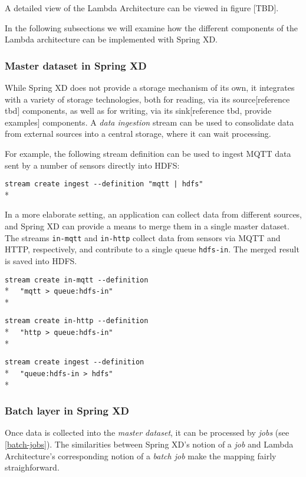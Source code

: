 A detailed view of the Lambda Architecture can be viewed in figure [TBD].

In the following subsections we will examine how the different components
of the Lambda architecture can be implemented with Spring XD.

\subsubsection {Master dataset in Spring XD}

While Spring XD does not provide a storage mechanism of its own, it 
integrates with a variety of storage technologies, both for reading,
via its source[reference tbd] components, as well as for writing, via 
its sink[reference tbd, provide examples] components. A \emph{data ingestion}
stream can be used to consolidate data from external sources into a
central storage, where it can wait processing.

For example, the following stream definition can be used to ingest 
MQTT data sent by a number of sensors directly into HDFS:

\verb;stream create ingest --definition "mqtt | hdfs";\\*

In a more elaborate setting, an application can collect data from
different sources, and Spring XD can provide a means to merge them
in a single master dataset. The streams \texttt{in-mqtt} and \texttt{in-http}
collect data from sensors via MQTT and HTTP, respectively, and
contribute to a single queue \texttt{hdfs-in}. The merged result
is saved into HDFS.

\verb;stream create in-mqtt --definition ;\\*
\verb;  "mqtt > queue:hdfs-in";\\*

\verb;stream create in-http --definition  ;\\*
\verb;  "http > queue:hdfs-in";\\*

\verb;stream create ingest --definition  ;\\*
\verb;  "queue:hdfs-in > hdfs";\\*

\subsubsection {Batch layer in Spring XD}

Once data is collected into the \emph{master dataset}, it can be processed
by \emph{jobs} (see \ref{batch-jobs}). The similarities between Spring XD's
notion of a \emph{job} and Lambda Architecture's corresponding notion of
a \emph{batch job} make the mapping fairly straighforward.


